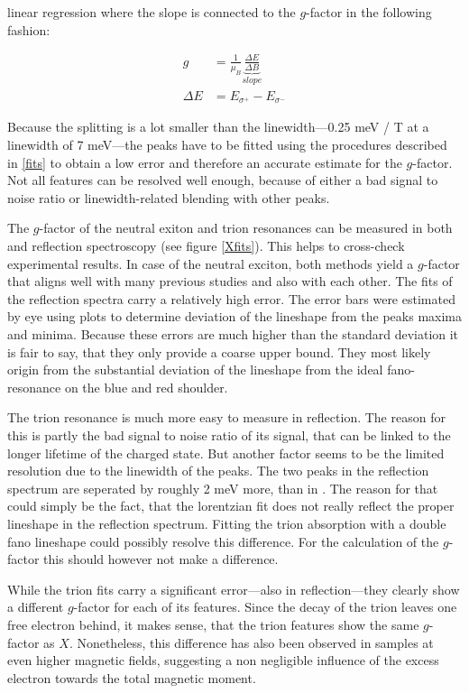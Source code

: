 linear regression where the slope is connected to the $g$-factor in the following fashion:

\begin{align}
	g &=  \frac{1}{\mu_B}\underbrace{\frac{\Delta E}{\Delta B}}_{slope} \\
	\Delta E &= E_{\sigma^+} - E_{\sigma^-}
\end{align}

Because the splitting is a lot smaller than the linewidth---0.25 meV / T at a linewidth of 7 meV---the peaks have to be fitted using the procedures described in \ref{fits} to obtain a low error and therefore an accurate estimate for the $g$-factor. Not all features can be resolved well enough, because of either a bad signal to noise ratio or linewidth-related blending with other peaks.

The $g$-factor of the neutral exiton and trion resonances can be measured in both \pl and reflection spectroscopy (see figure \ref{Xfits}). This helps to cross-check experimental results. In case of the neutral exciton, both methods yield a $g$-factor that aligns well with many previous studies \cite{plechinger_excitonic_2016, stier_exciton_2016, srivastava_valley_2015, mitioglu_magnetoexcitons_2016}and also with each other. The fits of the reflection spectra carry a relatively high error. The error bars were estimated by eye using plots to determine deviation of the lineshape from the peaks maxima and minima. Because these errors are much higher than the standard deviation it is fair to say, that they only provide a coarse upper bound. They most likely origin from the substantial deviation of the lineshape from the ideal fano-resonance on the blue and red shoulder.

The trion resonance is much more easy to measure in reflection. The reason for this is partly the bad signal to noise ratio of its \pl signal, that can be linked to the longer lifetime of the charged state\cite{hao_trion_2017}. But another factor seems to be the limited resolution due to the linewidth of the peaks. The two peaks in the reflection spectrum are seperated by roughly 2 meV more, than in \pl. The reason for that could simply be the fact, that the lorentzian fit does not really reflect the proper lineshape in the reflection spectrum. Fitting the trion absorption with a double fano lineshape could possibly resolve this difference. For the calculation of the $g$-factor this should however not make a difference.

While the trion fits carry a significant error---also in reflection---they clearly show a different $g$-factor for each of its features. Since the decay of the trion leaves one free electron behind, it makes sense, that the trion features show the same $g$-factor as $X$. Nonetheless, this difference has also been observed in \ws samples at even higher magnetic fields, suggesting a non negligible influence of the excess electron towards the total magnetic moment\cite{plechinger_excitonic_2016}.

